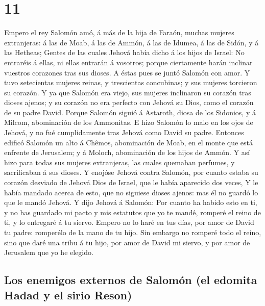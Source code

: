 \hypertarget{section-10}{%
\section{11}\label{section-10}}

 Empero el rey Salomón amó, á más de la hija de Faraón,
muchas mujeres extranjeras: á las de Moab, á las de Ammón, á las de
Idumea, á las de Sidón, y á las Hetheas;  Gentes de las
cuales Jehová había dicho á los hijos de Israel: No entraréis á ellas,
ni ellas entrarán á vosotros; porque ciertamente harán inclinar vuestros
corazones tras sus dioses. A éstas pues se juntó Salomón con amor.
 Y tuvo setecientas mujeres reinas, y trescientas
concubinas; y sus mujeres torcieron su corazón.  Y ya que
Salomón era viejo, sus mujeres inclinaron su corazón tras dioses ajenos;
y su corazón no era perfecto con Jehová su Dios, como el corazón de su
padre David.  Porque Salomón siguió á Astaroth, diosa de
los Sidonios, y á Milcom, abominación de los Ammonitas.  E
hizo Salomón lo malo en los ojos de Jehová, y no fué cumplidamente tras
Jehová como David su padre.  Entonces edificó Salomón un
alto á Chêmos, abominación de Moab, en el monte que está enfrente de
Jerusalem; y á Moloch, abominación de los hijos de Ammón. 
Y así hizo para todas sus mujeres extranjeras, las cuales quemaban
perfumes, y sacrificaban á sus dioses.  Y enojóse Jehová
contra Salomón, por cuanto estaba su corazón desviado de Jehová Dios de
Israel, que le había aparecido dos veces,  Y le había
mandado acerca de esto, que no siguiese dioses ajenos: mas él no guardó
lo que le mandó Jehová.  Y dijo Jehová á Salomón: Por
cuanto ha habido esto en ti, y no has guardado mi pacto y mis estatutos
que yo te mandé, romperé el reino de ti, y lo entregaré á tu siervo.
 Empero no lo haré en tus días, por amor de David tu
padre: romperélo de la mano de tu hijo.  Sin embargo no
romperé todo el reino, sino que daré una tribu á tu hijo, por amor de
David mi siervo, y por amor de Jerusalem que yo he elegido.

\hypertarget{los-enemigos-externos-de-salomuxf3n-el-edomita-hadad-y-el-sirio-reson}{%
\subsection{Los enemigos externos de Salomón (el edomita Hadad y el
sirio
Reson)}\label{los-enemigos-externos-de-salomuxf3n-el-edomita-hadad-y-el-sirio-reson}}

